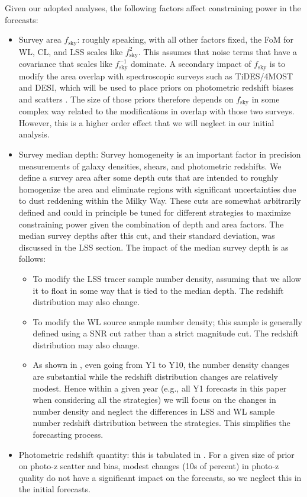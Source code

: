 Given our adopted analyses, the following factors affect constraining power in the forecasts:
\begin{itemize}
\item Survey area $f_\text{sky}$: roughly speaking, with all other factors fixed, the FoM for WL,
  CL, and LSS scales like $f_\text{sky}^2$.  This assumes that noise terms that have a covariance
  that scales like $f_\text{sky}^{-1}$ dominate.    A secondary impact of
  $f_\text{sky}$ is to modify the area overlap with spectroscopic surveys such as TiDES/4MOST and
  DESI, which will be used to place priors on photometric redshift biases and scatters
  . The size of those priors therefore depends on $f_\text{sky}$ in some complex
  way related to the modifications in overlap with those two surveys.  However, this is a higher
  order effect that we will neglect in our initial analysis.
\item Survey median depth: Survey homogeneity is an important factor in precision measurements of
  galaxy densities, shears, and photometric redshifts.  We define a survey area after some depth
  cuts that are intended to roughly homogenize the area and eliminate regions with significant
  uncertainties due to dust reddening within the Milky Way.  These cuts are somewhat arbitrarily
  defined and could in principle be tuned for different strategies to maximize constraining power
  given the combination of depth and area factors.  The median survey depths after this cut, and
  their standard deviation, was discussed in the LSS section.    The impact of the median survey depth is as follows:
  \begin{itemize}
    \item To modify the LSS tracer sample number density, assuming that we allow it to float in some
      way that is tied to the median depth.  The redshift distribution may also change.
    \item To modify the WL source sample number density; this sample is generally defined using a
      SNR cut rather than a strict magnitude cut.  The redshift distribution may also change.
    \item As shown in \cite{DESCSRD2018}, even going from Y1 to Y10, the number density changes are
      substantial while the redshift distribution changes are relatively modest.  Hence within a
      given year (e.g., all Y1 forecasts in this paper when considering all the strategies) we will
      focus on the changes in number density and neglect the differences in LSS and WL sample number
      redshift distribution between the strategies.  This simplifies the forecasting process.
  \end{itemize}
\item Photometric redshift quantity: this is tabulated in .  For a given size of prior on
  photo-z scatter and bias, modest changes (10s of percent) in photo-z quality do not have a
  significant impact on the forecasts, so we neglect this in the initial forecasts.
\end{itemize}

